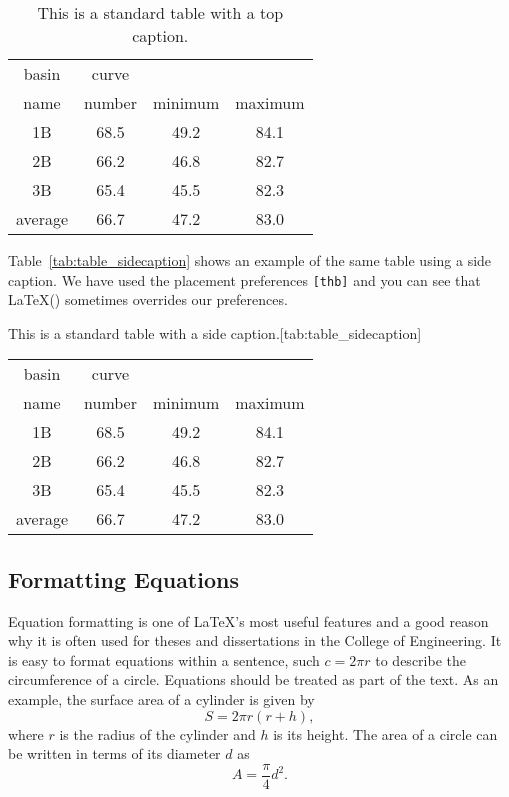 \begin{table}[hbt]
	\centering
	\caption{This is a standard table with a top caption.}
	\label{tab:table_example}	\begin{tabular}{ c c c c}
		\toprule
		basin & curve \\
		name & number & minimum & maximum \\
		\midrule
		1B & 68.5 & 49.2 & 84.1 \\ 
		2B & 66.2 & 46.8 & 82.7\\ 
		3B & 65.4 & 45.5 & 82.3\\
		\midrule
		average & 66.7 & 47.2 & 83.0\\
		\bottomrule
	\end{tabular}
\end{table}

Table~\ref{tab:table_sidecaption} shows an example of the same table using a side caption. We have used the placement preferences \verb|[thb]| and you can see that \LaTeX() sometimes overrides our preferences.
\begin{table}[thb]
	\begin{sidecaption}{This is a standard table with a side caption.}[tab:table_sidecaption]
		\centering
		\begin{tabular}{ c c c c}
			\toprule
			basin & curve \\
			name & number & minimum & maximum \\
			\midrule
			1B & 68.5 & 49.2 & 84.1 \\ 
			2B & 66.2 & 46.8 & 82.7\\ 
			3B & 65.4 & 45.5 & 82.3\\
			\midrule
			average & 66.7 & 47.2 & 83.0\\
			\bottomrule
		\end{tabular}
	\end{sidecaption}
\end{table}

\subsection{Formatting Equations}
Equation formatting is one of \LaTeX's most useful features and a good reason why it is often used for theses and dissertations in the College of Engineering. It is easy to format equations within a sentence, such $c = 2 \pi r$ to describe the circumference of a circle. Equations should be treated as part of the text. As an example, the surface area of a cylinder is given by 
\begin{equation}
	\label{eq:surface_area_cyl}
	S = 2\pi r \left( r + h \right) , 
\end{equation}
where $r$ is the radius of the cylinder and $h$ is its height. The area of a circle can be written in terms of its diameter $d$ as 
\begin{equation}
	\label{eq:area_circle}
	A = \frac{\pi}{4} d^2 .
\end{equation}


